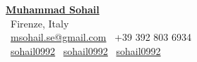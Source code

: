 \documentclass{res} %
\begin{document}
\thispagestyle{empty}


\begin{center}
 {\Large\bfseries \href{https://msohail.work}{Muhammad Sohail}} \\[4pt]
  \faMapMarker\ Firenze, Italy \\[4pt]
  \Letter\ \href{mailto:msohail.se@gmail.com}{msohail.se@gmail.com} \quad
  \Mobilefone\ +39 392 803 6934 \\[4pt]
  \faGithub\ \href{https://github.com/sohail0992}{sohail0992} \quad
  \faLinkedin\ \href{https://linkedin.com/in/sohail0992}{sohail0992} \quad
  \faStackOverflow\ \href{https://stackoverflow.com/users/sohail0992}{sohail0992}
\end{center}
\end{document}
